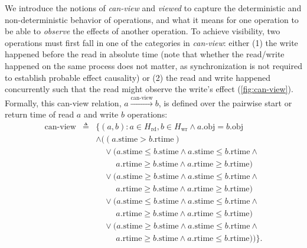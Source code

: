   We introduce the notions of \textit{can-view} and \textit{viewed}
  to capture the
  deterministic and non-deterministic behavior of operations,
  and what it means for one operation to be able to \textit{observe}
  the effects of another operation. To achieve visibility, two
  operations must first fall in one of
  the categories in \textit{can-view}: either (1) the write happened
  before the read
  in absolute time (note that whether the read/write happened on the
    same process does not matter, as synchronization
  is not required to establish probable effect causality)
  or (2) the read and write happened concurrently such that the read might
  observe the write's effect (\cref{fig:can-view}).
  Formally, this can-view relation, $a \xrightarrow{\text{can-view}} b$,
  is defined over the pairwise start or return time of read $a$ and
  write $b$ operations:
  \begin{eqnarray*}
    \text{can-view} & \triangleq & \{(a, b) : a \in H_\text{rd}, b \in
      H_\text{wr} \land a.\text{obj} = b.\text{obj} \\
      & & \land ((a.\text{stime} > b.\text{rtime}) \\
        & & \quad\lor (a.\text{stime} \leq b.\text{stime} \land
          a.\text{stime} \leq b.\text{rtime} \land \\
          & & \quad\quad\ \ a.\text{rtime} \geq b.\text{stime} \land
        a.\text{rtime} \geq b.\text{rtime}) \\
        & & \quad\lor (a.\text{stime} \geq b.\text{stime} \land
          a.\text{stime} \leq b.\text{rtime} \land \\
          & & \quad\quad\ \ a.\text{rtime} \geq b.\text{stime} \land
        a.\text{rtime} \geq b.\text{rtime}) \\
        & & \quad\lor (a.\text{stime} \leq b.\text{stime} \land
          a.\text{stime} \leq b.\text{rtime} \land \\
          & & \quad\quad\ \ a.\text{rtime} \geq b.\text{stime} \land
        a.\text{rtime} \leq b.\text{rtime}) \\
        & & \quad\lor (a.\text{stime} \geq b.\text{stime} \land
          a.\text{stime} \leq b.\text{rtime} \land \\
          & & \quad\quad\ \ a.\text{rtime} \geq b.\text{stime} \land
          a.\text{rtime} \leq b.\text{rtime}
        )
    )\}.
  \end{eqnarray*}

